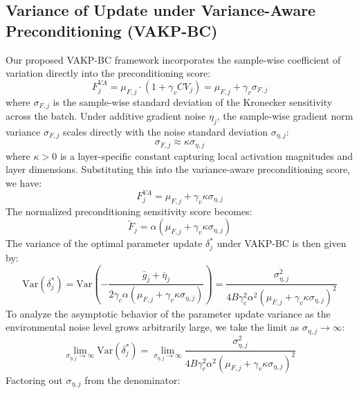 \documentclass{article}
\theoremstyle{plain}
\theoremstyle{definition}
\theoremstyle{remark}
\begin{document}
\subsection{Variance of Update under Variance-Aware Preconditioning (VAKP-BC)}
Our proposed VAKP-BC framework incorporates the sample-wise coefficient of variation directly into the preconditioning score:
\begin{equation}
    F_j^{VA} = \mu_{F, j} \cdot (1 + \gamma_v CV_j) = \mu_{F, j} + \gamma_v \sigma_{F, j}
\end{equation}
where $\sigma_{F, j}$ is the sample-wise standard deviation of the Kronecker sensitivity across the batch. Under additive gradient noise $\eta_j$, the sample-wise gradient norm variance $\sigma_{F, j}$ scales directly with the noise standard deviation $\sigma_{\eta, j}$:
\begin{equation}
    \sigma_{F, j} \approx \kappa \sigma_{\eta, j}
\end{equation}
where $\kappa > 0$ is a layer-specific constant capturing local activation magnitudes and layer dimensions. Substituting this into the variance-aware preconditioning score, we have:
\begin{equation}
    F_j^{VA} = \mu_{F, j} + \gamma_v \kappa \sigma_{\eta, j}
\end{equation}
The normalized preconditioning sensitivity score becomes:
\begin{equation}
    \tilde{F}_j = \alpha \left( \mu_{F, j} + \gamma_v \kappa \sigma_{\eta, j} \right)
\end{equation}
The variance of the optimal parameter update $\delta_j^*$ under VAKP-BC is then given by:
\begin{equation}
    \mathrm{Var}(\delta_j^*) = \mathrm{Var}\left( -\frac{\bar{g}_j + \bar{\eta}_j}{2 \gamma_c \alpha (\mu_{F, j} + \gamma_v \kappa \sigma_{\eta, j})} \right) = \frac{\sigma_{\eta, j}^2}{4 B \gamma_c^2 \alpha^2 (\mu_{F, j} + \gamma_v \kappa \sigma_{\eta, j})^2}
\end{equation}
To analyze the asymptotic behavior of the parameter update variance as the environmental noise level grows arbitrarily large, we take the limit as $\sigma_{\eta, j} \to \infty$:
\begin{equation}
    \lim_{\sigma_{\eta, j} \to \infty} \mathrm{Var}(\delta_j^*) = \lim_{\sigma_{\eta, j} \to \infty} \frac{\sigma_{\eta, j}^2}{4 B \gamma_c^2 \alpha^2 (\mu_{F, j} + \gamma_v \kappa \sigma_{\eta, j})^2}
\end{equation}
Factoring out $\sigma_{\eta, j}$ from the denominator:
\end{document}
